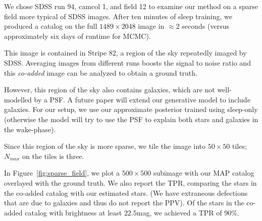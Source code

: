 We chose SDSS run 94, camcol 1, and field  12 to examine our method on a sparse field more typical of SDSS 
images. After ten minutes of sleep training, we produced a catalog on the full $1489\times 2048$ image in $\approx2$ seconds (versus approximately six days of runtime for MCMC). 

This image is contained in Stripe 82, a region of the sky repeatedly imaged by SDSS. Averaging images from different runs boosts the signal to noise ratio and this {\itshape co-added} image can be analyzed to obtain a ground truth. 

However, this region of the sky also contains galaxies, which are 
not well-modelled by a PSF. A future paper will extend our generative model to include galaxies. For our setup, we use our approximate posterior 
trained using sleep-only (otherwise the model will try to use the PSF to explain both stars and galaxies in the wake-phase). 

Since this region of the sky is more sparse, we tile the image into $50\times 50$ tiles; $N_{max}$ on the tiles is three. 

In Figure~\ref{fig:sparse_field}, we plot a $500\times 500$ subimage with 
our MAP catalog overlayed with the ground truth. We also report the 
TPR, comparing the stars in the co-added catalog with our estimated stars. (We have extraneous defections that are due to galaxies and thus 
do not report the PPV). Of the stars in the co-added catalog with brightness at least $22.5$mag, we achieved a TPR of 90\%. 


